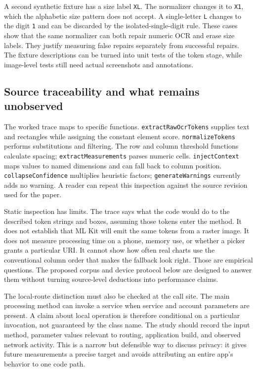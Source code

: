 \documentclass[10pt,letterpaper]{article}
\begin{document}
A second synthetic fixture has a size label \texttt{XL}. The normalizer changes it to \texttt{X1}, which the alphabetic size pattern does not accept. A single-letter \texttt{L} changes to the digit \texttt{1} and can be discarded by the isolated-single-digit rule. These cases show that the same normalizer can both repair numeric OCR and erase size labels. They justify measuring false repairs separately from successful repairs. The fixture descriptions can be turned into unit tests of the token stage, while image-level tests still need actual screenshots and annotations.

\subsection{Source traceability and what remains unobserved}

The worked trace maps to specific functions. \texttt{extractRawOcrTokens} supplies text and rectangles while assigning the constant element score. \texttt{normalizeTokens} performs substitutions and filtering. The row and column threshold functions calculate spacing; \texttt{extractMeasurements} parses numeric cells. \texttt{injectContext} maps values to named dimensions and can fall back to column position. \texttt{collapseConfidence} multiplies heuristic factors; \texttt{generateWarnings} currently adds no warning. A reader can repeat this inspection against the source revision used for the paper.

Static inspection has limits. The trace says what the code would do to the described token strings and boxes, assuming those tokens enter the method. It does not establish that ML Kit will emit the same tokens from a raster image. It does not measure processing time on a phone, memory use, or whether a picker grants a particular URI. It cannot show how often real charts use the conventional column order that makes the fallback look right. Those are empirical questions. The proposed corpus and device protocol below are designed to answer them without turning source-level deductions into performance claims.

The local-route distinction must also be checked at the call site. The main processing method can invoke a service when service and account parameters are present. A claim about local operation is therefore conditional on a particular invocation, not guaranteed by the class name. The study should record the input method, parameter values relevant to routing, application build, and observed network activity. This is a narrow but defensible way to discuss privacy: it gives future measurements a precise target and avoids attributing an entire app's behavior to one code path.
\end{document}
